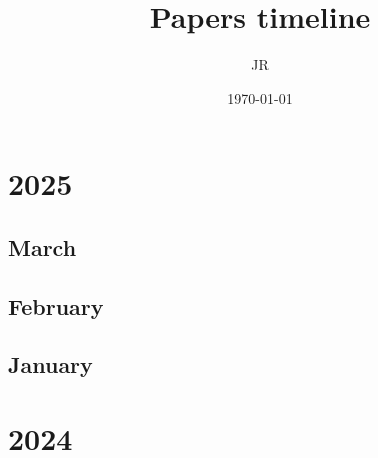 \documentclass[12pt]{article}
\begin{document}
\title{\Large Papers timeline}
\author{JR}
\date{\today}

\maketitle

\tableofcontents

\newpage
\section{2025}

\subsection{March}

\subsection{February}
\begin{refsection}
    \nocite{}
    \printbibliography[heading=none]
\end{refsection}


\subsection{January}
\begin{refsection}
    \nocite{deepseek-ai_deepseek-r1_2025}
    \printbibliography[heading=none]
\end{refsection}


\newpage
\section{2024}
\end{document}
